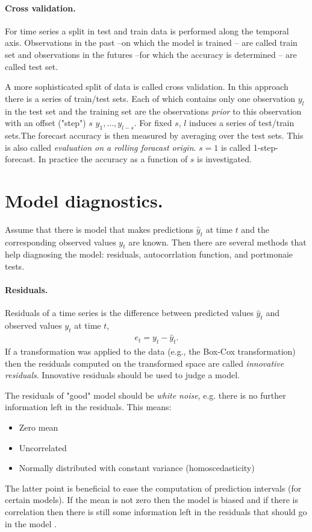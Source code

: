 \documentclass[12pt,a4paper]{article}
\begin{document}
 
 
\paragraph{Cross validation.} For time series a split in test and train data is performed along the temporal axis. Observations in the past --on which the model is trained -- are called train set and observations in the futures --for which the accuracy is determined --  are called test set. 

A more sophisticated split of data is called cross validation. In this approach there is a series of train/test sets. Each of which contains only one observation $y_l$ in the test set and the training set  are the observations \textit{prior} to this observation with an offset ("step") $s$ ${y_1, \dots, y_{l-s}}$. For fixed $s$, $l$ induces a series of test/train sets.The forecast accuracy is then measured by averaging over the test sets. This is also called \textit{evaluation on a rolling foracast origin}. $s=1$ is called 1-step-forecast. In practice the accuracy as a function of $s$ is investigated.

\section{Model diagnostics.} Assume that there is model that makes predictions  $\hat y_t$ at time $t$ and the corresponding observed values $y_t$ are known. Then there are several methods that help diagnosing the model: residuals, autocorrlation function, and portmonaie tests. 


\paragraph{Residuals.} Residuals of a time series is the difference between predicted values $\hat y_t$ and observed values  $y_t$ at time $t$, 
\begin{align}
	e_t = y_t - \hat y_t.
\end{align}
If a transformation was applied to the data (e.g., the Box-Cox transformation) then the residuals computed on the transformed space are called \textit{innovative residuals}. Innovative residuals should be used to judge a model.

The residuals of  "good" model should be \textit{white noise}, e.g. there is no further information left in the residuals. This means: 
\begin{itemize}
	\item Zero mean
	\item Uncorrelated
	\item Normally distributed with constant variance (homoscedasticity)
\end{itemize}
The latter point is beneficial to ease the computation of prediction intervals (for certain models).  If the mean is not zero then the model is biased and if there is correlation then there is still some information left in the residuals that should go in the model \cite{hyndman_forecasting_principles_2018}.
\end{document}
